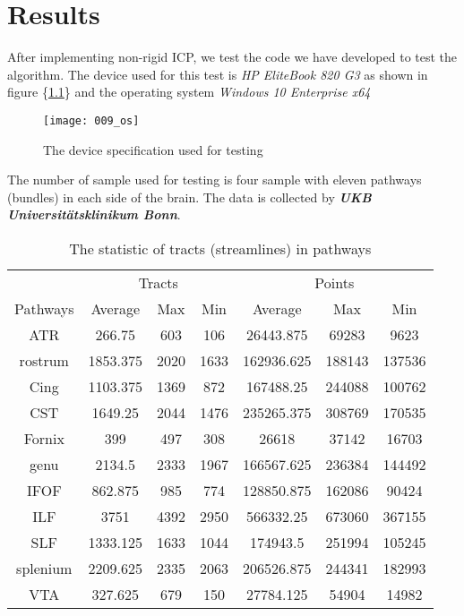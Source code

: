 \documentclass[../structure.tex]{subfiles}
\begin{document}
\chapter{Results}
\hspace{2em}After implementing non-rigid ICP, we test the code we have developed to test the algorithm. The device used for this test is \textit{HP EliteBook 820 G3} as shown in figure \{\ref{fig:OS}\} and the operating system \textit{Windows 10 Enterprise x64} 
\\
\begin{figure}[h!]
\centering
\texttt{[image: 009\_os]}
\captionsetup{justification=centering}
\caption{The device specification used for testing}
\label{fig:OS}
\end{figure}

The number of sample used for testing is four sample with eleven pathways (bundles) in each side of the brain. The data is collected by \textbf{\textit{UKB Universitätsklinikum Bonn}}. 
\begin{center}
\begin{table}[h!]
	\begin{tabular}{| c | c  c  c | c  c  c |}
	\toprule
	&\multicolumn{3}{c}{Tracts}&\multicolumn{3}{c}{Points}\\
Pathways&Average&Max&Min&Average&Max&Min\\
\midrule
ATR&266.75&603&106&26443.875&69283&9623\\
rostrum&1853.375&2020&1633&162936.625&188143&137536\\
Cing&1103.375&1369&872&167488.25&244088&100762\\
CST&1649.25&2044&1476&235265.375&308769&170535\\
Fornix&399&497&308&26618&37142&16703\\
genu&2134.5&2333&1967&166567.625&236384&144492\\
IFOF&862.875&985&774&128850.875&162086&90424\\
ILF&3751&4392&2950&566332.25&673060&367155\\
SLF&1333.125&1633&1044&174943.5&251994&105245\\
splenium&2209.625&2335&2063&206526.875&244341&182993\\
VTA&327.625&679&150&27784.125&54904&14982\\
\bottomrule
	\end{tabular}
\caption{The statistic of tracts (streamlines) in pathways}
\label{table:data}
\end{table}
\end{center}
\end{document}

